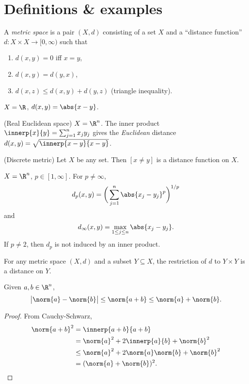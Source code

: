 \section{Definitions \& examples} \label{sec:defn}
\begin{definition*} \label{def:metric}
    A \emph{metric space} is a pair $(X, d)$ consisting of a set $X$ and a
    ``distance function'' $d\colon X \times X \to [0, \infty)$ such that
    \begin{enumerate}[label=\small(M\arabic*)]
        \item $d(x, y) = 0$ iff $x = y$, \label{def:metric:positivity}
        \item $d(x, y) = d(y, x)$, \label{def:metric:symmetry}
        \item $d(x, z) \le d(x, y) + d(y, z)$ (triangle inequality).
            \label{def:metric:triangle}
    \end{enumerate}
\end{definition*}
\begin{examples}
    \item $X = \R$, $d(x, y) = \abs{x - y}$.
    \item (Real Euclidean space) $X = \R^n$.
    The inner product $\innerp{x}{y} = \sum_{j=1}^n x_j y_j$ gives the
    \emph{Euclidean} distance $d(x, y) = \sqrt{\innerp{x - y}{x - y}}$.
    \item (Discrete metric) Let $X$ be any set.
    Then $[x \ne y]$ is a distance function on $X$.
    \item $X = \R^n$, $p \in [1, \infty]$.
    For $p \ne \infty$, \[
        d_p(x, y) = \bigg(\sum_{j=1}^n \abs{x_j - y_j}^p\bigg)^{1/p}
    \] and \[
        d_\infty(x, y) = \max_{1 \le j \le n} \abs{x_j - y_j}.
    \] If $p \ne 2$, then $d_p$ is not induced by an inner product.
    \item For any metric space $(X, d)$ and a subset $Y \subseteq X$, the
    restriction of $d$ to $Y \times Y$ is a distance on $Y$.
\end{examples}

\begin{proposition*}
    Given $a, b \in \R^n$, \[
        \big\lvert\norm{a} - \norm{b}\big\rvert
            \le \norm{a + b} \le \norm{a} + \norm{b}.
    \]
\end{proposition*}
\begin{proof}
    From Cauchy-Schwarz, \begin{align*}
        \norm{a + b}^2 &= \innerp{a + b}{a + b} \\
            &= \norm{a}^2 + 2\innerp{a}{b} + \norm{b}^2 \\
            &\le \norm{a}^2 + 2\norm{a}\norm{b} + \norm{b}^2 \\
            &= (\norm{a} + \norm{b})^2. \qedhere
    \end{align*}
\end{proof}
